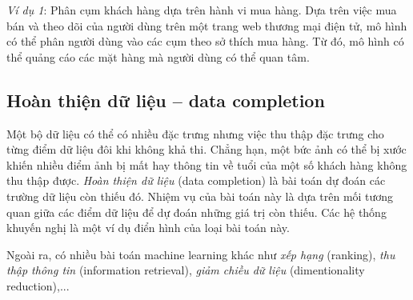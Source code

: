 \textit{Ví dụ 1}: Phân cụm khách hàng dựa trên hành vi mua hàng. Dựa trên việc mua bán và theo dõi của người dùng trên một trang web thương mại điện tử, mô hình có thể phân người dùng vào các cụm theo sở thích mua hàng. Từ đó, mô hình có thể quảng cáo các mặt hàng mà người dùng có thể quan tâm.


\subsection{Hoàn thiện dữ liệu -- data completion}
Một bộ dữ liệu có thể có nhiều đặc trưng nhưng việc thu thập đặc trưng cho từng
điểm dữ liệu đôi khi không khả thi. Chẳng hạn, một bức ảnh có thể bị xước khiến
nhiều điểm ảnh bị mất hay thông tin về tuổi của một số khách hàng không thu thập
được. \textit{Hoàn thiện dữ liệu} (data completion) là bài toán dự đoán các trường dữ liệu còn
thiếu đó. Nhiệm vụ của bài toán này là dựa trên mối tương quan giữa các điểm dữ
liệu để dự đoán những giá trị còn thiếu. Các hệ thống khuyến nghị là một ví dụ điển hình của loại bài toán này.

Ngoài ra, có nhiều bài toán machine learning khác như \textit{xếp hạng} (ranking), \textit{thu thập thông tin} (information retrieval), \textit{giảm chiều dữ liệu} (dimentionality reduction),...









